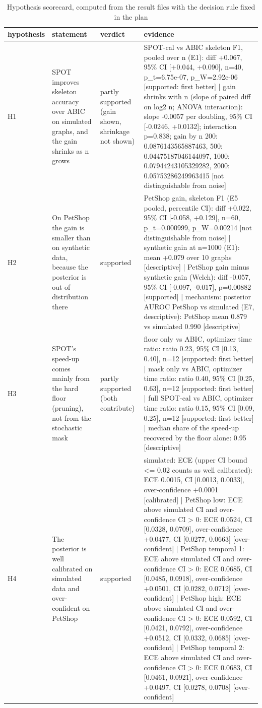 \begin{table}[t]
\centering\footnotesize
\caption{Hypothesis scorecard, computed from the result files with the decision rule fixed in the plan}\label{tab:T9_scorecard}
\begin{tabular}{@{}llll@{}}
\toprule
hypothesis & statement & verdict & evidence\\
\midrule
H1 & SPOT improves skeleton accuracy over ABIC on simulated graphs, and the gain shrinks as n grows & partly supported (gain shown, shrinkage not shown) & SPOT-cal vs ABIC skeleton F1, pooled over n (E1): diff +0.067, 95\% CI [+0.044, +0.090], n=40, p\_t=6.75e-07, p\_W=2.92e-06 [supported: first better] | gain shrinks with n (slope of paired diff on log2 n; ANOVA interaction): slope -0.0057 per doubling, 95\% CI [-0.0246, +0.0132]; interaction p=0.838; gain by n {200: 0.0876143565887463, 500: 0.04475187046144097, 1000: 0.07944243105329282, 2000: 0.05753286249963415} [not distinguishable from noise]\\
H2 & On PetShop the gain is smaller than on synthetic data, because the posterior is out of distribution there & supported & PetShop gain, skeleton F1 (E5 pooled, percentile CI): diff +0.022, 95\% CI [-0.058, +0.129], n=60, p\_t=0.000999, p\_W=0.00214 [not distinguishable from noise] | synthetic gain at n=1000 (E1): mean +0.079 over 10 graphs [descriptive] | PetShop gain minus synthetic gain (Welch): diff -0.057, 95\% CI [-0.097, -0.017], p=0.00882 [supported] | mechanism: posterior AUROC PetShop vs simulated (E7, descriptive): PetShop mean 0.879 vs simulated 0.990 [descriptive]\\
H3 & SPOT's speed-up comes mainly from the hard floor (pruning), not from the stochastic mask & partly supported (both contribute) & floor only vs ABIC, optimizer time ratio: ratio 0.23, 95\% CI [0.13, 0.40], n=12 [supported: first better] | mask only vs ABIC, optimizer time ratio: ratio 0.40, 95\% CI [0.25, 0.63], n=12 [supported: first better] | full SPOT-cal vs ABIC, optimizer time ratio: ratio 0.15, 95\% CI [0.09, 0.25], n=12 [supported: first better] | median share of the speed-up recovered by the floor alone: 0.95 [descriptive]\\
H4 & The posterior is well calibrated on simulated data and over-confident on PetShop & supported & simulated: ECE (upper CI bound <= 0.02 counts as well calibrated): ECE 0.0015, CI [0.0013, 0.0033], over-confidence +0.0001 [calibrated] | PetShop low: ECE above simulated CI and over-confidence CI > 0: ECE 0.0524, CI [0.0328, 0.0709], over-confidence +0.0477, CI [0.0277, 0.0663] [over-confident] | PetShop temporal 1: ECE above simulated CI and over-confidence CI > 0: ECE 0.0685, CI [0.0485, 0.0918], over-confidence +0.0501, CI [0.0282, 0.0712] [over-confident] | PetShop high: ECE above simulated CI and over-confidence CI > 0: ECE 0.0592, CI [0.0421, 0.0792], over-confidence +0.0512, CI [0.0332, 0.0685] [over-confident] | PetShop temporal 2: ECE above simulated CI and over-confidence CI > 0: ECE 0.0683, CI [0.0461, 0.0921], over-confidence +0.0497, CI [0.0278, 0.0708] [over-confident]\\

\end{tabular}
\end{table}
